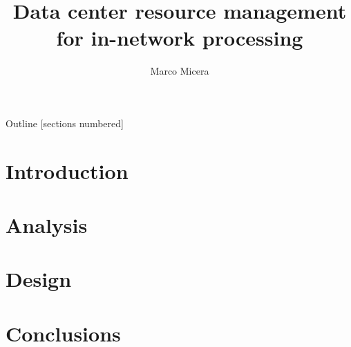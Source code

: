 

\title{Data center resource management for in-network processing}
\date{} %
\author{Marco Micera}



\maketitle

\begin{frame}{Outline}
  [sections numbered]
  \tableofcontents[hideallsubsections]
\end{frame}

\section{Introduction}


\section{Analysis}



\section{Design}


\section{Conclusions}






